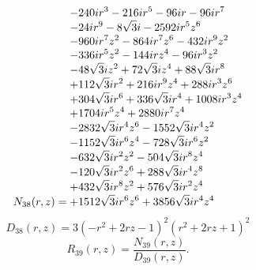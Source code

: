 \documentclass[11pt,a4paper]{article}
\begin{document}
\begin{equation}
N_{38}(r,z)=\shortstack[l]{$\displaystyle  - 240 i r^{3} - 216 i r^{5} - 96 i r - 96 i r^{7}$\\
$\displaystyle  - 24 i r^{9} - 8 \sqrt{3} i - 2592 i r^{5} z^{6}$\\
$\displaystyle  - 960 i r^{7} z^{2} - 864 i r^{7} z^{6} - 432 i r^{9} z^{2}$\\
$\displaystyle  - 336 i r^{5} z^{2} - 144 i r z^{4} - 96 i r^{3} z^{2}$\\
$\displaystyle  - 48 \sqrt{3} i z^{2} + 72 \sqrt{3} i z^{4} + 88 \sqrt{3} i r^{8}$\\
$\displaystyle  + 112 \sqrt{3} i r^{2} + 216 i r^{9} z^{4} + 288 i r^{3} z^{6}$\\
$\displaystyle  + 304 \sqrt{3} i r^{6} + 336 \sqrt{3} i r^{4} + 1008 i r^{3} z^{4}$\\
$\displaystyle  + 1704 i r^{5} z^{4} + 2880 i r^{7} z^{4}$\\
$\displaystyle  - 2832 \sqrt{3} i r^{4} z^{6} - 1552 \sqrt{3} i r^{4} z^{2}$\\
$\displaystyle  - 1152 \sqrt{3} i r^{6} z^{4} - 728 \sqrt{3} i r^{6} z^{2}$\\
$\displaystyle  - 632 \sqrt{3} i r^{2} z^{2} - 504 \sqrt{3} i r^{8} z^{4}$\\
$\displaystyle  - 120 \sqrt{3} i r^{2} z^{6} + 288 \sqrt{3} i r^{4} z^{8}$\\
$\displaystyle  + 432 \sqrt{3} i r^{8} z^{2} + 576 \sqrt{3} i r^{2} z^{4}$\\
$\displaystyle  + 1512 \sqrt{3} i r^{6} z^{6} + 3856 \sqrt{3} i r^{4} z^{4}$}
\label{eq:cat-numerator-38}
\end{equation}
\begin{equation}
D_{38}(r,z)=3 \left(- r^{2} + 2 r z - 1\right)^{2} \left(r^{2} + 2 r z + 1\right)^{2}
\label{eq:cat-denominator-38}
\end{equation}
\begin{equation}
R_{39}(r,z)=\frac{N_{39}(r,z)}{D_{39}(r,z)}.
\label{eq:cat-rational-39}
\end{equation}
\end{document}
